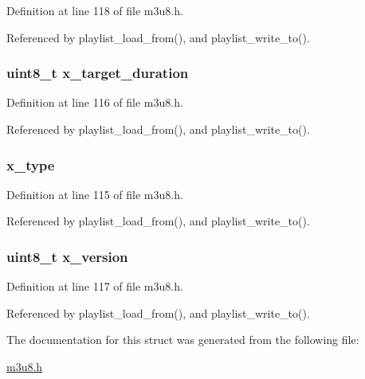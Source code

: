 \-Definition at line 118 of file m3u8.\-h.



\-Referenced by playlist\-\_\-load\-\_\-from(), and playlist\-\_\-write\-\_\-to().

\hypertarget{struct_playlist_a6362cba4f7d923dd7687284f0a890017}{
\subsubsection[{x\-\_\-target\-\_\-duration}]{\setlength{\rightskip}{0pt plus 5cm}uint8\-\_\-t {\bf x\-\_\-target\-\_\-duration}}}\label{struct_playlist_a6362cba4f7d923dd7687284f0a890017}


\-Definition at line 116 of file m3u8.\-h.



\-Referenced by playlist\-\_\-load\-\_\-from(), and playlist\-\_\-write\-\_\-to().

\hypertarget{struct_playlist_a37c60895b60bcb1cc626eae5885e0540}{
\subsubsection[{x\-\_\-type}]{ {\bf x\-\_\-type}}}\label{struct_playlist_a37c60895b60bcb1cc626eae5885e0540}


\-Definition at line 115 of file m3u8.\-h.



\-Referenced by playlist\-\_\-load\-\_\-from(), and playlist\-\_\-write\-\_\-to().

\hypertarget{struct_playlist_adbfa9836e57d677968274360b90147ce}{
\subsubsection[{x\-\_\-version}]{\setlength{\rightskip}{0pt plus 5cm}uint8\-\_\-t {\bf x\-\_\-version}}}\label{struct_playlist_adbfa9836e57d677968274360b90147ce}


\-Definition at line 117 of file m3u8.\-h.



\-Referenced by playlist\-\_\-load\-\_\-from(), and playlist\-\_\-write\-\_\-to().



\-The documentation for this struct was generated from the following file\-:\begin{DoxyCompactItemize}
\item 
\hyperlink{m3u8_8h}{m3u8.\-h}\end{DoxyCompactItemize}
